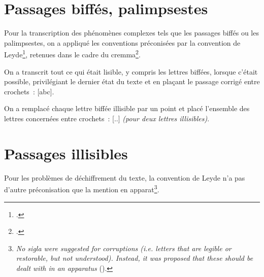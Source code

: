\documentclass[a4paper,12pt,twoside]{book}
\newcommand{\langue}[1]{\emph{#1}}
\begin{document}
		\section{Passages biffés, palimpsestes}
			Pour la transcription des phénomènes complexes tels que les passages biffés ou les palimpsestes, on a appliqué les conventions préconisées par la convention de Leyde\footcite{leidenConvention}, retenues dans le cadre du \gls{cremma}\footcite{pincheSeminaireCreationModele2021a}.
			
			On a transcrit tout ce qui était lisible, y compris les lettres biffées, lorsque c'était possible, privilégiant le dernier état du texte et en plaçant le passage corrigé entre crochets~: [abc].
		
			On a remplacé chaque lettre biffée illisible par un point et placé l'ensemble des lettres concernées entre crochets~: [..] \textit{(pour deux lettres illisibles)}.
		
		\section{Passages illisibles}
			Pour les problèmes de déchiffrement du texte, la convention de Leyde n'a pas d'autre préconisation que la mention en apparat\footnote{\langue{No sigla were suggested for corruptions (i.e. letters that are legible or restorable, but not understood). Instead, it was proposed that these should be dealt with in an apparatus} (\cite{leidenConvention}).}.
      	
	\printbibheading[heading=bibintoc]%
	\printbibliography[heading=subbibliography, title=Scripts, keyword=scripts]%
  \printbibliography[heading=subbibliography, title=Valorisation du projet, keyword=valorisation]%
  
\end{document}
